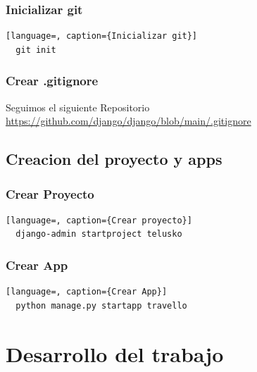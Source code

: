 \documentclass{article}
\begin{document}

  \subsubsection{Inicializar git}
  \begin{lstlisting}[language=, caption={Inicializar git}]
  git init
  \end{lstlisting}
  

  \subsubsection{Crear .gitignore}
  Seguimos el siguiente Repositorio \url{https://github.com/django/django/blob/main/.gitignore}
  
  
  \subsection{Creacion del proyecto y apps}
  

  \subsubsection{Crear Proyecto}
  \begin{lstlisting}[language=, caption={Crear proyecto}]
  django-admin startproject telusko
  \end{lstlisting}
  

  \subsubsection{Crear App}
  \begin{lstlisting}[language=, caption={Crear App}]
  python manage.py startapp travello
  \end{lstlisting}


  \section{Desarrollo del trabajo}
  
\end{document}
